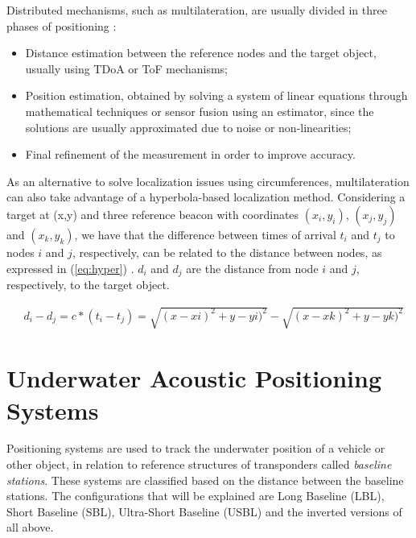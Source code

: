 Distributed mechanisms, such as multilateration, are usually divided in three phases of positioning \cite{suvey-loc}:
\begin{itemize}
	\item Distance estimation between the reference nodes and the target object, usually using TDoA or ToF mechanisms;
	\item Position estimation, obtained by solving a system of linear equations through mathematical techniques or sensor fusion using an estimator, since the solutions are usually approximated due to noise or non-linearities;
	\item Final refinement of the measurement in order to improve accuracy.
\end{itemize}

As an alternative to solve localization issues using circumferences, multilateration can also take advantage of a hyperbola-based localization method. Considering a target at (x,y) and three reference beacon with coordinates $(x_{i},y_{i})$,  $(x_{j},y_{j})$ and  $(x_{k},y_{k})$, we have that the difference between times of arrival $t_{i}$ and $t_{j}$ to nodes $i$ and $j$, respectively, can be related to the distance between nodes, as expressed in (\ref{eq:hyper}) \cite{arch_localiz}. $d_{i}$ and $d_{j}$ are the distance from node $i$ and $j$, respectively, to the target object. 

\begin{eqnarray}
	& d_{i} - d_{j} = c * (t_{i} - t_{j}) = \sqrt{(x - x{i})^2 + y - y{i})^2} - \sqrt{(x - x{k})^2 + y - y{k})^2}
	\label{eq:hyper}
\end{eqnarray}


\section{Underwater Acoustic Positioning Systems}

Positioning systems are used to track the underwater position of a vehicle or other object, in relation to reference structures of transponders called \textit{baseline stations}. These systems are classified based on the distance between the baseline stations. The configurations that will be explained are Long Baseline (LBL), Short Baseline (SBL), Ultra-Short Baseline (USBL) and the inverted versions of all above.

